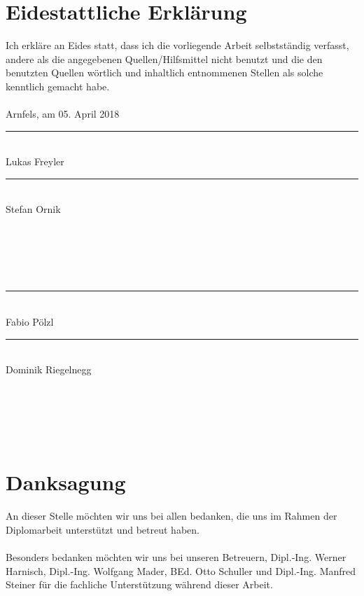 \frontmatter												%
\addtocounter{page}{2}

\newcommand{\doublesignature}[2]{%
  \parbox{\textwidth}{
    \hfill
    \parbox{7cm}{
      \centering
      \rule{6cm}{1pt}\\
      #1
    }
    \parbox{7cm}{
      \centering
      \rule{6cm}{1pt}\\
      #2
    }
  }
  \mbox{}\\
  \mbox{}\\
  \mbox{}\\
  \mbox{}\\
}

\vspace*{20pt}

\section*{Eidestattliche Erklärung}
\label{sec:eidestattliche-erklaerung}
Ich erkläre an Eides statt, dass ich die vorliegende Arbeit selbstständig verfasst, andere als die angegebenen
Quellen/Hilfsmittel nicht benutzt und die den benutzten Quellen wörtlich und inhaltlich entnommenen
Stellen als solche kenntlich gemacht habe.\\
\\
Arnfels, am 05. April 2018\\

\vskip 2cm

\doublesignature{Lukas Freyler}{Stefan Ornik}
\doublesignature{Fabio Pölzl}{Dominik Riegelnegg}

\vskip 5cm

\clearpage

\newpage
\thispagestyle{empty}
\mbox{}

\clearpage

\section*{Danksagung}
\label{sec:danksagung}
An dieser Stelle möchten wir uns bei allen bedanken, die uns im Rahmen der Diplomarbeit unterstützt und betreut haben.\\
\\
Besonders bedanken möchten wir uns bei unseren Betreuern, Dipl.-Ing. Werner Harnisch, Dipl.-Ing. Wolfgang Mader, BEd. Otto Schuller
und Dipl.-Ing. Manfred Steiner für die fachliche Unterstützung während dieser Arbeit.

\newpage

